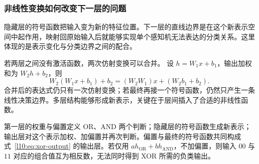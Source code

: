 \subsubsection{非线性变换如何改变下一层的问题}
隐藏层的符号函数把输入变为新的特征位置。下一层的直线边界是在这个新表示空间中起作用，映射回原始输入后就能够实现单个感知机无法表达的分类关系。这里体现的是表示变化与分类边界之间的配合。

若两层之间没有激活函数，两次仿射变换可以合并。
设 $h=W_1x+b_1$，输出加权和为 $W_2h+b_2$，则
\begin{equation}
 W_2(W_1x+b_1)+b_2
 =(W_2W_1)x+(W_2b_1+b_2).
 \label{l10:eq:affine-collapse}
\end{equation}
合并后的表达式仍只有一次仿射变换；若最终再接一个符号函数，仍然只产生一条线性决策边界。多层结构能够形成新表示，关键在于层间插入了合适的非线性函数。

\begin{keybox}[title={XOR 例子的三个组成部分}]
第一层的权重与偏置定义 OR、AND 两个判断；隐藏层的符号函数生成新表示；输出层对这个表示加权、加偏置并再次判断。偏置与最终的符号函数共同构成式~\eqref{l10:eq:xor-output} 的输出层。若仅用 $a h_{\mathrm{OR}}+b h_{\mathrm{AND}}$，不加偏置，则输入 $00$ 与 $11$ 对应的组合值互为相反数，无法同时得到 XOR 所需的负类输出。
\end{keybox}
